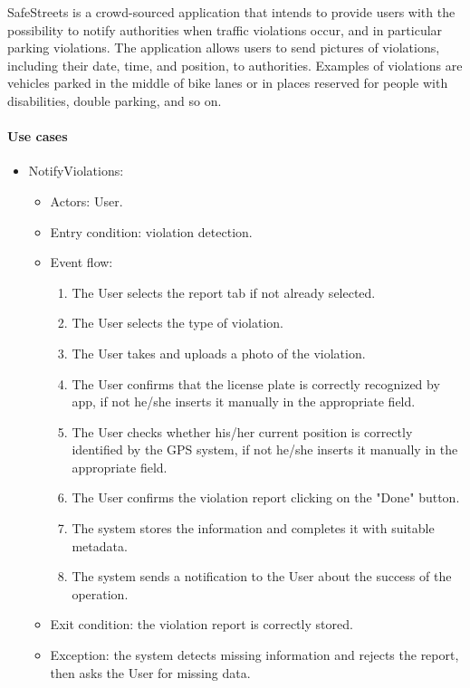 SafeStreets is a crowd-sourced application that intends to provide users with the possibility to notify authorities when traffic violations occur, and in particular parking violations. The application allows users to send pictures of violations, including their date, time, and position, to authorities. Examples of violations are vehicles parked in the middle of bike lanes or in places reserved for people with disabilities, double parking, and so on.


\paragraph{Use cases}
    \begin{itemize}
        \item NotifyViolations:
        \begin{itemize}
            \item Actors: User.
            \item Entry condition: violation detection.
            \item Event flow:
            \begin{enumerate}
                \item The User selects the report tab if not already selected.
                \item The User selects the type of violation.
                \item The User takes and uploads a photo of the violation.
                \item The User confirms that the license plate is correctly recognized by app, if not he/she inserts it manually in the appropriate field.
                \item The User checks whether his/her current position is correctly identified by the GPS system, if not he/she inserts it manually in the appropriate field.
                \item The User confirms the violation report clicking on the "Done" button.
                \item The system stores the information and completes it with suitable metadata.
                \item The system sends a notification to the User about the success of the operation.
            \end{enumerate}
            \item Exit condition: the violation report is correctly stored.
            \item Exception: the system detects missing information and rejects the report, then asks the User for missing data.

\end{itemize}
\end{itemize}
